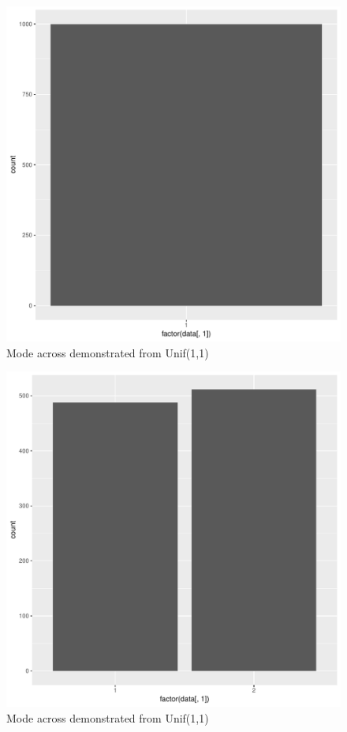 \documentclass[11pt]{article}
\begin{document}
\begin{enumerate}
\begin{enumerate}
\begin{figure}[H]
	\end{figure}
	\begin{figure}[H]
		\centering
		\caption{Mode across demonstrated from Unif(1,1)}
		\includegraphics[scale=.4]{2graph.pdf}
	\end{figure}
	\begin{figure}[H]
		\centering
		\caption{Mode across demonstrated from Unif(1,1)}
		\includegraphics[scale=.4]{3graph.pdf}

\end{figure}
\end{enumerate}
\end{enumerate}
\end{document}
